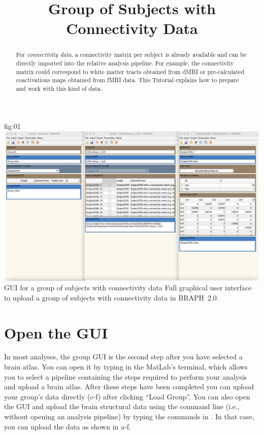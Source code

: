 \documentclass[justified]{tufte-handout}
\title{Group of Subjects with Connectivity Data}
\begin{document}
\maketitle

\begin{abstract}
\noindent
For \emph{connectivity data}, a connectivity matrix per subject is already available and can be directly imported into the relative analysis pipeline. For example, the connectivity matrix could correspond to white matter tracts obtained from dMRI or pre-calculated coactivations maps obtained from fMRI data.
This Tutorial explains how to prepare and work with this kind of data.
\end{abstract}

\tableofcontents

	{fig:01}
	{\includegraphics{fig01.jpg}}
	{GUI for a group of subjects with connectivity data}
	{
	Full graphical user interface to upload a group of subjects with connectivity data in BRAPH~2.0. 
	}

\clearpage
\section{Open the GUI}

In most analyses, the group GUI is the second step after you have selected a brain atlas. You can open it by typing  in the MatLab's terminal, which allows you to select a pipeline containing the steps required to perform your analysis and upload a brain atlas. After these steps have been completed you can upload your group's data directly (c-f) after clicking ``Load Group''. You can also open the GUI and upload the brain structural data using the command line (i.e., without opening an analysis pipeline) by typing the commands in . In that case, you can upload the data as shown in a-f.
\end{document}
